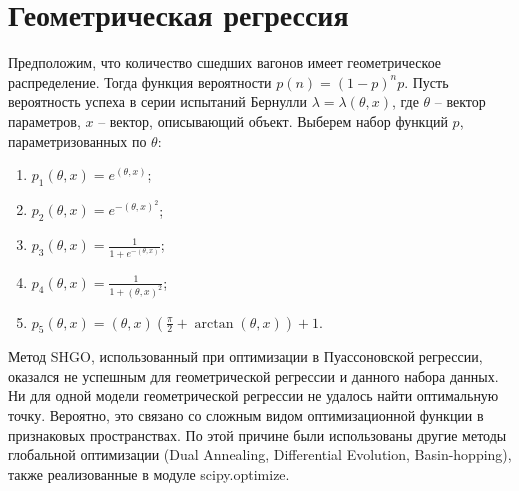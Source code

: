 \begin{center}
\end{center}
\label{tab:poisson_tab}


\section{Геометрическая регрессия}

Предположим, что количество сшедших вагонов имеет геометрическое распределение. Тогда функция вероятности $p(n) = (1-p)^n p$. Пусть вероятность успеха в серии испытаний Бернулли $\lambda = \lambda(\theta, x)$, где $\theta$ -- вектор параметров, $x$ -- вектор, описывающий объект. Выберем набор функций $p$, параметризованных по $\theta$:
\begin{enumerate}[label=\arabic*.]
    \item $p_1(\theta, x) = e^{(\theta, x)}$;
    \item $p_2(\theta, x) = e^{-(\theta, x)^2}$;
    \item $p_3(\theta, x) = \frac{1}{1+e^{-(\theta, x)}}$;
    \item $p_4(\theta, x) = \frac{1}{1 + (\theta, x)^2}$;
    \item $p_5(\theta, x) = (\theta, x) (\frac{\pi}{2} + \arctan(\theta, x)) + 1$.
\end{enumerate}

Метод SHGO, использованный при оптимизации в Пуассоновской регрессии, оказался не успешным для геометрической регрессии и данного набора данных. Ни для одной модели геометрической регрессии не удалось найти оптимальную точку. Вероятно, это связано со сложным видом оптимизационной функции в признаковых пространствах. По этой причине были использованы другие методы глобальной оптимизации (Dual Annealing, Differential Evolution, Basin-hopping), также реализованные в модуле scipy.optimize.

